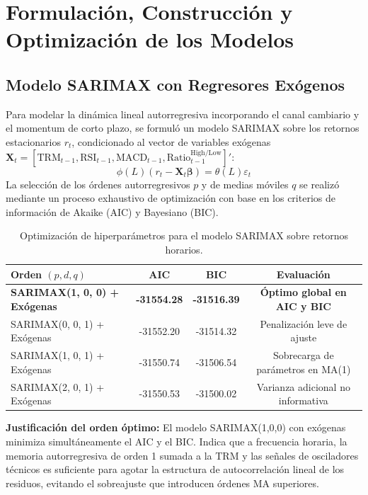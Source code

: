 \documentclass[12pt,letterpaper]{article}
\begin{document}
\section{Formulación, Construcción y Optimización de los Modelos}

\subsection{Modelo SARIMAX con Regresores Exógenos}
Para modelar la dinámica lineal autorregresiva incorporando el canal cambiario y el momentum de corto plazo, se formuló un modelo SARIMAX sobre los retornos estacionarios $r_t$, condicionado al vector de variables exógenas $\mathbf{X}_t = [\text{TRM}_{t-1}, \text{RSI}_{t-1}, \text{MACD}_{t-1}, \text{Ratio}_{t-1}^{\text{High/Low}}]'$:
\begin{equation}
\phi(L) (r_t - \mathbf{X}_t \boldsymbol{\beta}) = \theta(L) \varepsilon_t
\end{equation}
La selección de los órdenes autorregresivos $p$ y de medias móviles $q$ se realizó mediante un proceso exhaustivo de optimización con base en los criterios de información de Akaike (AIC) y Bayesiano (BIC).

\begin{table}[H]
\centering
\caption{Optimización de hiperparámetros para el modelo SARIMAX sobre retornos horarios.}
\label{tab:sarimax_grid}
\begin{tabular}{lccc}
\toprule
\textbf{Orden $(p, d, q)$} & \textbf{AIC} & \textbf{BIC} & \textbf{Evaluación} \\
\midrule
\textbf{SARIMAX(1, 0, 0) + Exógenas} & \textbf{-31554.28} & \textbf{-31516.39} & \textbf{Óptimo global en AIC y BIC} \\
SARIMAX(0, 0, 1) + Exógenas & -31552.20 & -31514.32 & Penalización leve de ajuste \\
SARIMAX(1, 0, 1) + Exógenas & -31550.74 & -31506.54 & Sobrecarga de parámetros en MA(1) \\
SARIMAX(2, 0, 1) + Exógenas & -31550.53 & -31500.02 & Varianza adicional no informativa \\
\bottomrule
\end{tabular}
\end{table}

\textbf{Justificación del orden óptimo:} El modelo SARIMAX(1,0,0) con exógenas minimiza simultáneamente el AIC y el BIC. Indica que a frecuencia horaria, la memoria autorregresiva de orden 1 sumada a la TRM y las señales de osciladores técnicos es suficiente para agotar la estructura de autocorrelación lineal de los residuos, evitando el sobreajuste que introducen órdenes MA superiores.
\end{document}
